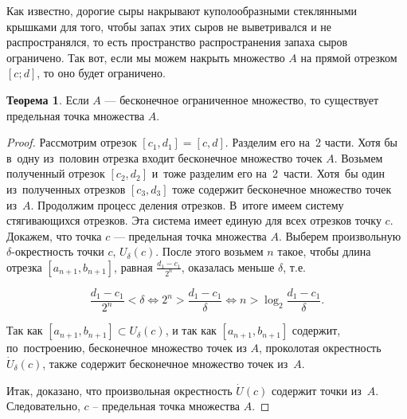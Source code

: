 \documentclass[pdftex, 12pt, a4paper]{article}
\def \dt{\delta}
\theoremstyle{definition} %
\newtheorem{myth}{Теорема}
\numberwithin{problem}{section}
\numberwithin{blits}{section}
\begin{document}
Как известно, дорогие сыры накрывают куполообразными стеклянными крышками для того, чтобы запах этих сыров не выветривался и не распространялся, то есть пространство распространения запаха сыров ограничено. Так вот, если мы можем накрыть множество $A$ на прямой отрезком $[c;d]$, то оно будет ограничено.

\begin{myth}
Если $A$ --- бесконечное ограниченное множество, то существует предельная точка множества $A$.
\end{myth}
\begin{proof}
Рассмотрим отрезок $[c_1,d_1]=[c,d]$. Разделим его на~2 части. Хотя бы в~одну из~половин отрезка входит бесконечное множество точек $A$. Возьмем полученный отрезок $[c_2,d_2]$ и~тоже разделим его на~2~части. Хотя~бы один из~полученных отрезков $[c_3,d_3]$ тоже содержит бесконечное множество точек из~$A$. Продолжим процесс деления отрезков. В~итоге имеем систему стягивающихся отрезков. Эта система имеет единую для всех отрезков точку $c$. Докажем, что точка $c$ --- предельная точка множества $A$. Выберем произвольную $\dt$-окрестность точки $c$, $U_{\dt}(c)$.  После этого возьмем $n$ такое, чтобы длина отрезка $[a_{n+1},b_{n+1}]$, равная $\frac{d_1-c_1}{2^n}$, оказалась меньше $\dt$, т.е.

\[\frac{d_1-c_1}{2^n} < \dt \Leftrightarrow 2^n > \frac{d_1-c_1}{\dt} \Leftrightarrow n> \log_2 \frac{d_1-c_1}{\dt}.\]



Так как $[a_{n+1},b_{n+1}] \subset U_{\dt}(c)$, и так как $[a_{n+1},b_{n+1}]$ содержит, по~построению, бесконечное множество точек из $A$, проколотая окрестность $\dot U_{\dt}(c)$, также содержит бесконечное множество точек из~$A$.

\begin{center}
\end{center}

 Итак, доказано, что произвольная окрестность $\dot U(c)$ содержит точки из~$A$. Следовательно, $c$ – предельная точка множества $A$.
\end{proof}
\end{document}
